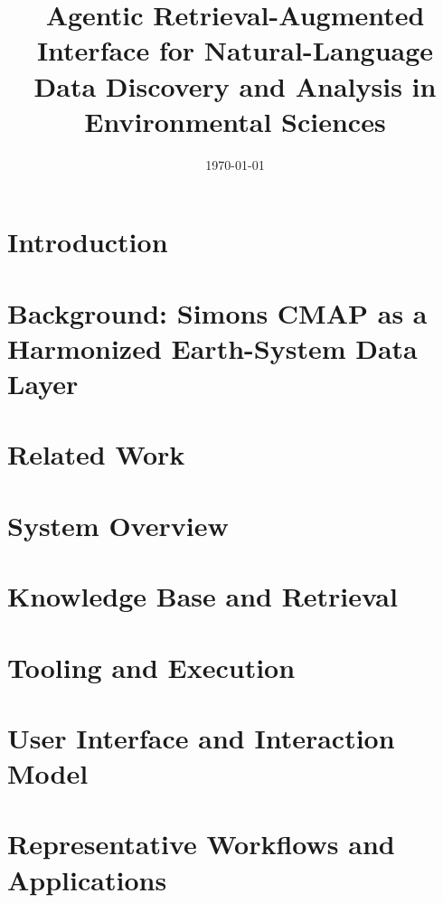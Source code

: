 \documentclass[11pt]{article}
\title{Agentic Retrieval-Augmented Interface for Natural-Language Data Discovery and Analysis in Environmental Sciences}
\date{\today}
\begin{document}
\maketitle

\begin{abstract}

\end{abstract}

\section{Introduction}\label{sec:intro}


\section{Background: Simons CMAP as a Harmonized Earth-System Data Layer}\label{sec:bg}


\section{Related Work}\label{sec:related}


\section{System Overview}\label{sec:overview}


\section{Knowledge Base and Retrieval}\label{sec:kb}


\section{Tooling and Execution}\label{sec:tools}


\section{User Interface and Interaction Model}\label{sec:ui}


\section{Representative Workflows and Applications}\label{sec:workflows}

\end{document}

